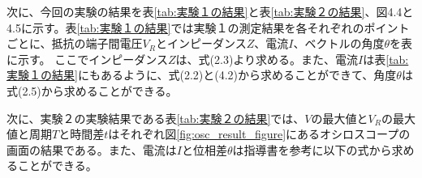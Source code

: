 \documentclass[10pt,a4paper]{jsarticle}
\numberwithin{equation}{section}
\numberwithin{figure}{section}
\numberwithin{table}{section}
\begin{document}
  次に、今回の実験の結果を表\ref{tab:実験１の結果}と表\ref{tab:実験２の結果}、図4.4と4.5に示す。表\ref{tab:実験１の結果}では実験１の測定結果を各それぞれのポイントごとに、抵抗の端子間電圧$V_R$とインピーダンス$Z$、電流$I$、ベクトルの角度$\theta$を表に示す。
  ここでインピーダンス$Z$は、式(2.3)より求める。また、電流$I$は表\ref{tab:実験１の結果}にもあるように、式(2.2)と(4.2)から求めることができて、角度$\theta$は式(2.5)から求めることができる。
  \begin{table}[H]
  \caption{実験１の結果（電圧$V=\SI{2.0}{\volt}$、周波数$f=\SI{1.0}{\kilo\hertz}$、$C=\SI{0.11}{\micro\farad}）$}\label{tab:実験１の結果}
  \begin{center}
  \end{center}
  \end{table}

  次に、実験２の実験結果である表\ref{tab:実験２の結果}では、$V$の最大値と$V_R$の最大値と周期$T$と時間差$t$はそれぞれ図\ref{fig:osc_result_figure}にあるオシロスコープの画面の結果である。また、電流は$I$と位相差$\theta$は指導書を参考に以下の式から求めることができる。
\end{document}
